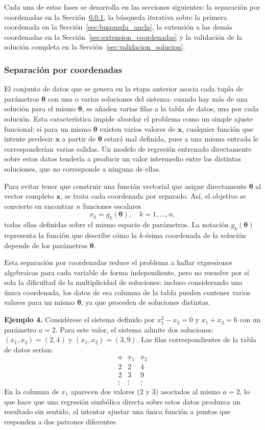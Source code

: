 \documentclass{article} \usepackage[utf8]{inputenc} \usepackage[spanish]{babel} \spanishdecimal{.} \usepackage{amsmath, amssymb, amsthm} \usepackage{bm} \usepackage{float} \usepackage{longtable} \usepackage[hidelinks]{hyperref}
\newcommand{\xvec}{\mathbf{x}} \newcommand{\thetavec}{\boldsymbol{\theta}} \newcommand{\Fvec}{\mathbf{F}} \newcommand{\R}{\mathbb{R}} \newcommand{\norm}[1]{\left\lVert#1\right\rVert} \newcommand{\loss}{\mathcal{L}} \newcommand{\dataset}{\mathcal{D}} \newcommand{\jac}{\mathbf{J}}
\begin{document}
Cada una de estas fases se desarrolla en las secciones siguientes: la
separación por coordenadas en la
Sección~\ref{sec:desacoplamiento}, la búsqueda iterativa sobre la
primera coordenada en la Sección~\ref{sec:busqueda_ancla}, la extensión
a las demás coordenadas en la
Sección~\ref{sec:extension_coordenadas} y la validación de la solución
completa en la Sección~\ref{sec:validacion_solucion}.

\subsubsection{Separación por coordenadas}
\label{sec:desacoplamiento}

El conjunto de datos que se genera en la etapa anterior asocia cada
tupla de parámetros \(\thetavec\) con una o varias soluciones del
sistema: cuando hay más de una solución para el mismo \(\thetavec\),
se añaden varias filas a la tabla de datos, una por cada solución.
Esta característica impide abordar el problema como un simple ajuste
funcional: si para un mismo \(\thetavec\) existen varios valores de
\(\xvec\), cualquier función que intente predecir \(\xvec\) a partir
de \(\thetavec\) estará mal definida, pues a una misma entrada le
corresponderían varias salidas. Un modelo de regresión entrenado
directamente sobre estos datos tendería a producir un valor intermedio
entre las distintas soluciones, que no corresponde a ninguna de ellas.

Para evitar tener que construir una función vectorial que asigne
directamente \(\thetavec\) al vector completo \(\xvec\), se trata cada
coordenada por separado. Así, el objetivo se convierte en encontrar
\(n\) funciones escalares
\[
x_k = g_k(\thetavec), \quad k = 1, \dots, n,
\]
todas ellas definidas sobre el mismo espacio de parámetros. La
notación \(g_k(\thetavec)\) representa la función que describe cómo la
\(k\)-ésima coordenada de la solución depende de los parámetros
\(\thetavec\).

Esta separación por coordenadas reduce el problema a hallar
expresiones algebraicas para cada variable de forma independiente,
pero no resuelve por sí sola la dificultad de la multiplicidad de
soluciones: incluso considerando una única coordenada, los datos de
esa columna de la tabla pueden contener varios valores para un mismo
\(\thetavec\), ya que proceden de soluciones distintas.

\noindent\textbf{Ejemplo 4.} Considérese el sistema definido por
\(x_1^2 - x_2 = 0\) y \(x_1 + x_2 = 6\) con un parámetro
\(a = 2\). Para este valor, el sistema admite dos soluciones:
\((x_1, x_2) = (2, 4)\) y \((x_1, x_2) = (3, 9)\). Las filas
correspondientes de la tabla de datos serían:
\[
\begin{array}{c|c|c}
a & x_1 & x_2 \\
\hline
2 & 2 & 4 \\
2 & 3 & 9 \\
\vdots & \vdots & \vdots
\end{array}
\]
En la columna de \(x_1\) aparecen dos valores (\(2\) y \(3\))
asociados al mismo \(a = 2\), lo que hace que una regresión simbólica
directa sobre estos datos produzca un resultado sin sentido, al
intentar ajustar una única función a puntos que responden a dos
patrones diferentes.
\end{document}
